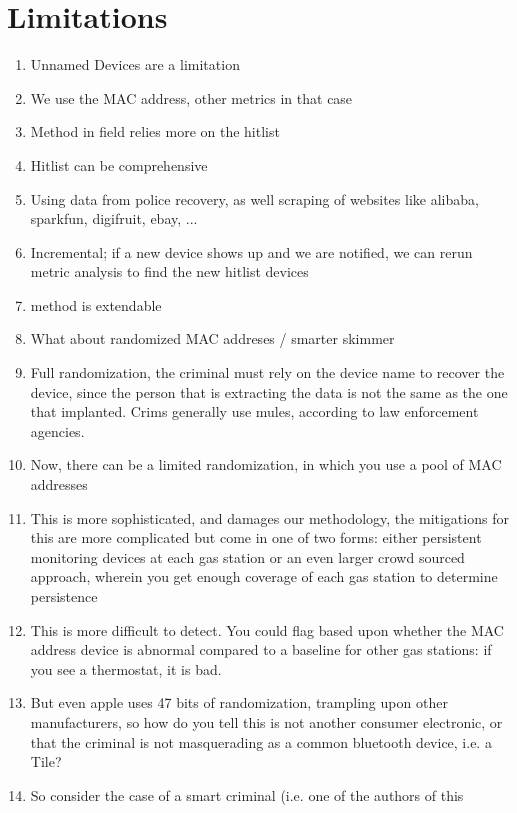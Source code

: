 \section{Limitations}

\begin{enumerate}
\item  Unnamed Devices are a limitation
\item   We use the MAC address, other metrics in that case
\item   Method in field relies more on the hitlist
\item     Hitlist can be comprehensive
\item     Using data from police recovery, as well scraping of
    websites like alibaba, sparkfun, digifruit, ebay, ...
\item    	      Incremental; if a new device shows up and
	     we are notified, we can rerun metric analysis to
	     find the new hitlist devices
\item	      method is extendable
\item What about randomized MAC addreses / smarter skimmer
\item   Full randomization, the criminal must rely on the device name
  to recover the device, since the person that is extracting the
  data is not the same as the one that implanted. Crims generally
  use mules, according to law enforcement agencies.
\item   Now, there can be a limited randomization, in which you use
  a pool of MAC addresses
\item     This is more sophisticated, and damages our methodology, the
    mitigations for this are more complicated but come in one of
    two forms: either persistent monitoring devices at each gas station
    or an even larger crowd sourced approach, wherein you get enough coverage
    of each gas station to determine persistence
\item        This is more difficult to detect. You could flag based upon whether
       the MAC address device is abnormal compared to a baseline for other
       gas stations: if you see a thermostat, it is bad.
\item        But even apple uses 47 bits of randomization, trampling upon other
       manufacturers, so how do you tell this is not another consumer
       electronic, or that the criminal is not masquerading as a common
       bluetooth device, i.e. a Tile?
\item  So consider the case of a smart criminal (i.e. one of the authors of this

\end{enumerate}
